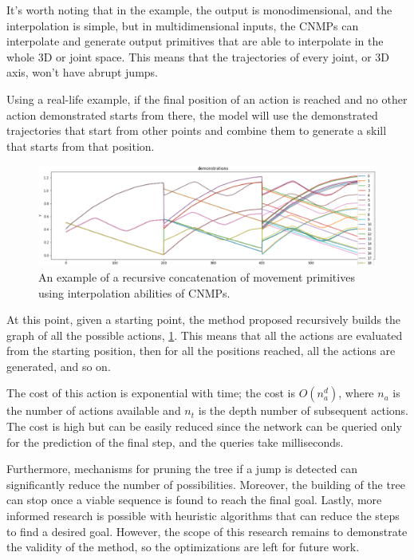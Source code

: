It's worth noting that in the example, the output is monodimensional, and the interpolation is simple, but in multidimensional inputs, the CNMPs can interpolate and generate output primitives that are able to interpolate in the whole 3D or joint space. This means that the trajectories of every joint, or 3D axis, won't have abrupt jumps. 

Using a real-life example, if the final position of an action is reached and no other action demonstrated starts from there, the model will use the demonstrated trajectories that start from other points and combine them to generate a skill that starts from that position.

\begin{figure}
    \centering
    \includegraphics[width=0.9\linewidth]{figures/diff-traj-concat.png}
    \caption{ An example of a recursive concatenation of movement primitives using interpolation abilities of CNMPs. }
    \label{fig:diff-traj-concat}
\end{figure}

At this point, given a starting point, the method proposed recursively builds the graph of all the possible actions, \cref{fig:diff-traj-concat}.
This means that all the actions are evaluated from the starting position, then for all the positions reached, all the actions are generated, and so on. 

The cost of this action is exponential with time; the cost is $O(n_a^{d})$, where $n_a$ is the number of actions available and $n_t$ is the depth number of subsequent actions. The cost is high but can be easily reduced since the network can be queried only for the prediction of the final step, and the queries take milliseconds. 

Furthermore, mechanisms for pruning the tree if a jump is detected can significantly reduce the number of possibilities.
Moreover, the building of the tree can stop once a viable sequence is found to reach the final goal.
Lastly, more informed research is possible with heuristic algorithms that can reduce the steps to find a desired goal.
However, the scope of this research remains to demonstrate the validity of the method, so the optimizations are left for future work.

